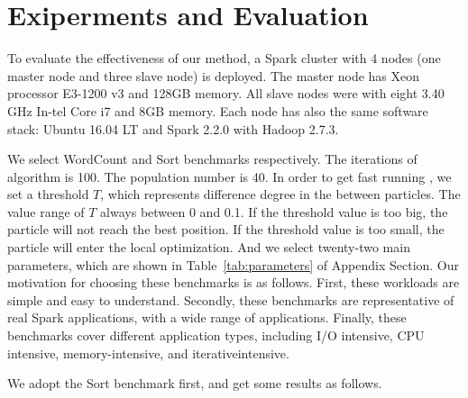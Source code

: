 \section{Exiperments and Evaluation}\label{sec:evaluation}
\par  To evaluate the effectiveness of our method, a Spark cluster with 4 nodes (one master node and three slave node) is deployed. The master node has Xeon processor E3-1200 v3 and 128GB memory. All slave nodes were with eight 3.40 GHz In-tel Core i7 and 8GB memory. Each node has also the same software stack: Ubuntu 16.04 LT and Spark 2.2.0 with Hadoop 2.7.3. 
\par We select WordCount and Sort benchmarks respectively. The iterations of algorithm is 100. The population number is 40. In order to get fast running , we set a threshold $T$, which represents difference degree in the between particles.  The value range of $T$ always between 0 and 0.1. If the threshold value is too big,  the particle will not reach the best position. If the threshold value is too small, the particle will enter the local optimization. And we select twenty-two main parameters, which are shown in Table~\ref{tab:parameters} of Appendix Section. Our motivation for choosing these benchmarks is as follows. First, these workloads are simple and easy to understand. Secondly, these benchmarks are representative of real Spark applications, with a wide range of applications. Finally, these benchmarks cover different application types, including I/O intensive, CPU intensive, memory-intensive, and iterativeintensive.
\par We adopt the Sort benchmark first, and get some results as follows. 
